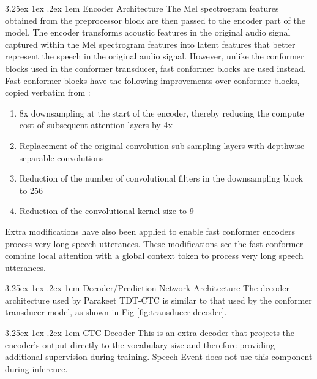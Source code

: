 \documentclass{CSSRforAfrica}
\makeatletter
\renewcommand\paragraph{\@startsection{paragraph}{4}{0pt}%
  {3.25ex \@plus1ex \@minus.2ex}%
  {1em}%
  {\normalfont\normalsize\itshape}}
\makeatother
\begin{document}
\paragraph{Encoder Architecture}
The Mel spectrogram features obtained from the preprocessor block are then passed to the encoder part of the model. The encoder transforms acoustic features in the original audio signal captured within the Mel spectrogram features into latent features that better represent the speech in the original audio signal. However, unlike the conformer blocks used in the conformer transducer, fast conformer blocks are used instead. Fast conformer blocks have the following improvements over conformer blocks, copied verbatim from \cite{rekesh2023fastconformerlinearlyscalable}:

\begin{enumerate}
    \item 8x downsampling at the start of the encoder, thereby reducing the compute cost of subsequent attention layers by 4x
    \item Replacement of the original convolution sub-sampling layers with depthwise separable convolutions
    \item Reduction of the number of convolutional filters in the downsampling block to 256
    \item Reduction of the convolutional kernel size to 9
\end{enumerate}

Extra modifications have also been applied to enable fast conformer encoders process very long speech utterances. These modifications see the fast conformer combine local attention with a global context token to process very long speech utterances.

\paragraph{Decoder/Prediction Network Architecture}
The decoder architecture used by Parakeet TDT-CTC is similar to that used by the conformer transducer model, as shown in Fig \ref{fig:transducer-decoder}.

\paragraph{CTC Decoder}
This is an extra decoder that projects the encoder's output directly to the vocabulary size and therefore providing additional supervision during training. Speech Event does not use this component during inference.
\end{document}
